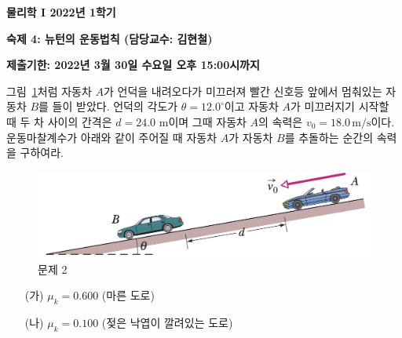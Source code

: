 \documentclass[fleqn,10pt]{article}%
\begin{document}
\begin{center}
\textbf{\Large 물리학 I 2022년 1학기}
\vspace{0.5cm}

\textbf{숙제 4: 뉴턴의 운동법칙 (담당교수: 김현철)}
\end{center}
\vspace{0.8cm}

\textbf{\color{red}제출기한: 2022년 3월 30일 수요일 오후 15:00시까지}
\vspace{1.0cm}



 그림~\ref{fig:2}처럼 자동차 $A$가
언덕을 내려오다가 미끄러져 빨간 신호등 앞에서 멈춰있는 자동차 $B$를
들이 받았다. 언덕의 각도가 $\theta=12.0^\circ$이고 자동차 $A$가
미끄러지기 시작할 때 두 차 사이의 간격은 $d=24.0$ m이며 그때 자동차
$A$의 속력은 $v_0=18.0\,\mathrm{m/s}$이다. 운동마찰계수가 아래와 같이
주어질 때 자동차 $A$가 자동차 $B$를 추돌하는 순간의 속력을 구하여라. 
\begin{figure}[htp]
  \centering
\includegraphics[scale=0.4]{hwfig4-2-20210402.png}
  \caption{문제 2}
\label{fig:2}  
\end{figure}
\begin{itemize}
\item[(가)] $\mu_k=0.600$ (마른 도로)
\item[(나)] $\mu_k=0.100$ (젖은 낙엽이 깔려있는 도로)
\end{itemize}
\end{document}
